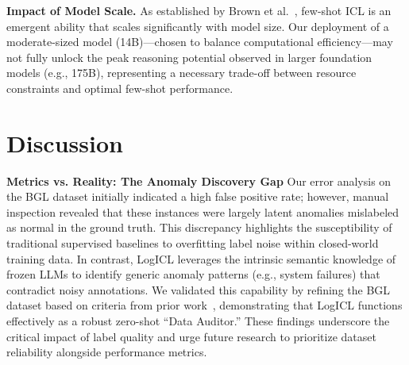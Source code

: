 \documentclass[lettersize,journal]{IEEEtran}
\begin{document}
\textbf{Impact of Model Scale.} As established by Brown et al.~\cite{brown2020language}, few-shot ICL is an emergent ability that scales significantly with model size. Our deployment of a moderate-sized model (14B)—chosen to balance computational efficiency—may not fully unlock the peak reasoning potential observed in larger foundation models (e.g., 175B), representing a necessary trade-off between resource constraints and optimal few-shot performance.

\section{Discussion}
\textbf{Metrics vs. Reality: The Anomaly Discovery Gap} Our error analysis on the BGL dataset initially indicated a high false positive rate; however, manual inspection revealed that these instances were largely latent anomalies mislabeled as normal in the ground truth. This discrepancy highlights the susceptibility of traditional supervised baselines to overfitting label noise within closed-world training data. In contrast, LogICL leverages the intrinsic semantic knowledge of frozen LLMs to identify generic anomaly patterns (e.g., system failures) that contradict noisy annotations. We validated this capability by refining the BGL dataset based on criteria from prior work~\cite{xu2025rationanomaly}, demonstrating that LogICL functions effectively as a robust zero-shot ``Data Auditor.'' These findings underscore the critical impact of label quality and urge future research to prioritize dataset reliability alongside performance metrics.
\end{document}
